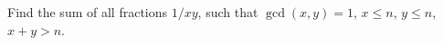 Find the sum of all fractions $1/xy$, such that $\gcd(x, y) = 1$, $x \leq n$, $y \leq n$, $x + y > n$.
